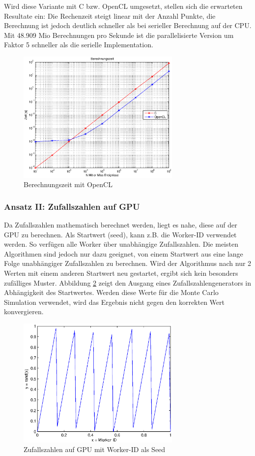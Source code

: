 \documentclass{book}
\begin{document}
\begin{refsection}
Wird diese Variante mit C bzw. OpenCL umgesetzt, stellen sich die erwarteten Resultate ein: Die Rechenzeit steigt linear mit der Anzahl Punkte, die Berechnung ist jedoch deutlich schneller als bei serieller Berechnung auf der CPU. Mit 48.909 Mio Berechnungen pro Sekunde ist die parallelisierte Version um Faktor 5 schneller  als die serielle Implementation.

\begin{figure}[htbp]
	\centering
	\includegraphics[width=8cm]{images/Berechnungszeit_OpenCL.eps}
	\caption{Berechnungszeit mit OpenCL}
	\label{fig:OpenCL_Berechnungszeit}
\end{figure}


\subsubsection{Ansatz II: Zufallszahlen auf GPU}
Da Zufallszahlen mathematisch berechnet werden, liegt es nahe, diese auf der GPU zu berechnen. Als Startwert (seed), kann z.B. die Worker-ID verwendet werden. So verfügen alle Worker über unabhängige Zufallszahlen. Die meisten Algorithmen sind jedoch nur dazu geeignet, von einem Startwert aus eine lange Folge unabhängiger Zufallszahlen zu berechnen. Wird der Algorithmus nach nur 2 Werten mit einem anderen Startwert neu gestartet, ergibt sich kein besonders zufälliges Muster. Abbildung \ref{fig:OpenCL_ID_Seed} zeigt den Ausgang eines Zufallszahlengenerators in Abhängigkeit des Startwertes. Werden diese Werte für die Monte Carlo Simulation verwendet, wird das Ergebnis nicht gegen den korrekten Wert konvergieren. 

\begin{figure}[htbp]
	\centering
	\includegraphics[width=8cm]{images/idAsSeed.eps}
	\caption{Zufallszahlen auf GPU mit Worker-ID als Seed}
	\label{fig:OpenCL_ID_Seed}
\end{figure}


\end{refsection}
\end{document}
